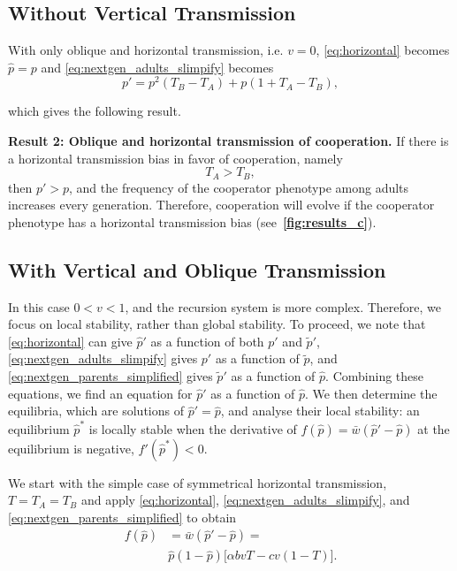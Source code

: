 \documentclass[12pt]{extarticle}
\begin{document}
\subsection*{Without Vertical Transmission}

With only oblique and horizontal transmission, i.e. $v = 0$, \autoref{eq:horizontal} becomes $\hat{p}=p$ and \autoref{eq:nextgen_adults_slimpify} becomes %
\begin{equation}  \label{eq:nextgen_parents_oblique_only}
p' = p^2 (T_B-T_A) + p (1+T_A-T_B) ,
\end{equation}

which gives the following result.

\textbf{Result 2: Oblique and horizontal transmission of cooperation.} 
If there is a horizontal transmission bias in favor of cooperation, namely
\begin{equation} \label{eq:oblique_only_result}
T_A > T_B, 
\end{equation}
then $p'>p$, and the frequency of the cooperator phenotype among adults increases every generation.
Therefore, cooperation will evolve if the cooperator phenotype has a horizontal transmission bias (see~\textbf{\autoref{fig:results_c}}).

\subsection*{With Vertical and Oblique Transmission}

In this case $0<v<1$, and the recursion system is more complex.
Therefore, we focus on local stability, rather than global stability.
To proceed, we note that 
\autoref{eq:horizontal} can give $\hat{p}'$ as a function of both $p'$ and $\tilde{p}'$,
\autoref{eq:nextgen_adults_slimpify} gives $p'$ as a function of $\tilde{p}$, and 
\autoref{eq:nextgen_parents_simplified} gives $\tilde{p}'$ as a function of $\hat{p}$. 
Combining these equations, we find an equation for $\hat{p}'$ as a function of $\hat{p}$.
We then determine the equilibria, which are solutions of $\hat{p}' = \hat{p}$, and analyse their local stability: an equilibrium $\hat{p}^*$ is locally stable when the derivative of $f(\hat{p})=\bar{w}(\hat{p}'-\hat{p})$ at the equilibrium is negative, $f'(\hat{p}^*)<0$. 

We start with the simple case of symmetrical horizontal transmission, $T=T_A=T_B$ and 
apply \autoref{eq:horizontal}, \autoref{eq:nextgen_adults_slimpify}, and \autoref{eq:nextgen_parents_simplified} to obtain 
\begin{equation} \label{eq:equal_horizontal_transmission}
\begin{aligned}
  f(\hat{p}) &= 
  \bar{w}(\hat{p}' - \hat{p}) = \\
  &\hat{p}(1-\hat{p})\big[\alpha bvT - cv(1-T)\big]. %
\end{aligned}
\end{equation}
\end{document}

